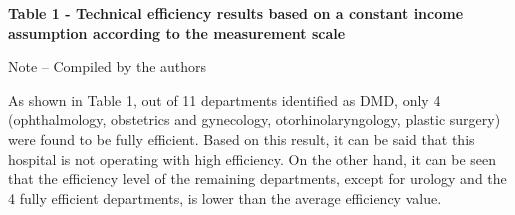 {\bfseries Table 1 - Technical efficiency results based on a constant income assumption according to the measurement scale}


Note -- Compiled by the authors

As shown in Table 1, out of 11 departments identified as DMD, only 4
(ophthalmology, obstetrics and gynecology, otorhinolaryngology, plastic
surgery) were found to be fully efficient. Based on this result, it can
be said that this hospital is not operating with high efficiency. On the
other hand, it can be seen that the efficiency level of the remaining
departments, except for urology and the 4 fully efficient departments,
is lower than the average efficiency value.

